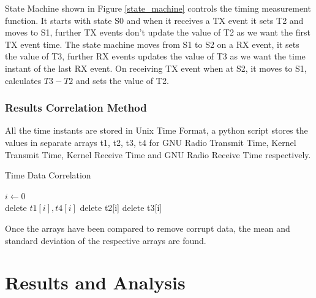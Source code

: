 \documentclass{kththesis}
\begin{document}
State Machine shown in Figure \ref{state_machine} controls the timing measurement function. It starts with state S0 and when it receives a TX event it sets T2 and moves to S1, further TX events don't update the value of T2 as we want the first TX event time. The state machine moves from S1 to S2 on a RX event, it sets the value of T3, further RX events updates the value of T3 as we want the time instant of the last RX event. On receiving TX event when at S2, it moves to S1, calculates $T3-T2$ and sets the value of T2.
\subsection{Results Correlation Method}
All the time instants are stored in Unix Time Format, a python script stores the values in separate arrays t1, t2, t3, t4 for GNU Radio Transmit Time, Kernel Transmit Time, Kernel Receive Time and GNU Radio Receive Time respectively. 

\begin{algorithm}[!h]
\caption{Time Data Correlation}
\begin{algorithmic}
\State $i \gets 0$
 \\
\hspace{1.35cm} delete $t1[i],t4[i]$
delete t2[i]
delete t3[i] 
\EndIf
\EndFor
\end{algorithmic}
\end{algorithm}

Once the arrays have been compared to remove corrupt data, the mean and standard deviation of the respective arrays are found.

\chapter{Results and Analysis}
\end{document}

